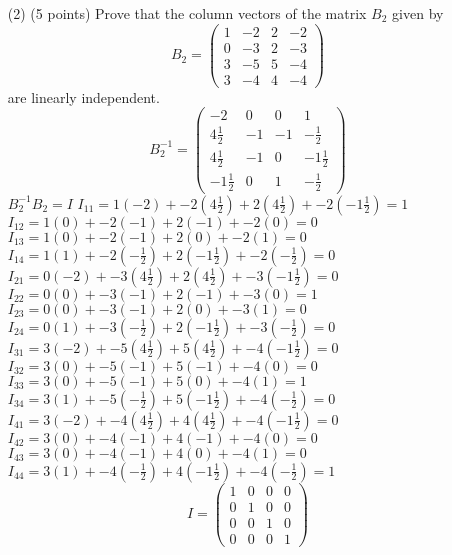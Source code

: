 \documentclass[12pt]{article}
\begin{document}
\begin{itemize}
\item[(2)](5 points)
Prove that the column vectors of the matrix $B_2$ given by 
\[
B_2 = 
\begin{pmatrix}
1 & -2 & 2 & -2\\
0 & -3 & 2 & -3 \\
3 & -5 & 5 & -4 \\
3 & -4 & 4 & -4
\end{pmatrix}
\]
are linearly  independent.
\[
B_2^{-1} = 
\begin{pmatrix}
-2 & 0 & 0 & 1\\
4\frac{1}{2} & -1 & -1 & -\frac{1}{2} \\
4\frac{1}{2} & -1 & 0 & -1\frac{1}{2} \\
-1\frac{1}{2} & 0 & 1 & -\frac{1}{2}
\end{pmatrix}
\]
$B_2^{-1}B_2=I$
\newline $I_{11}=1(-2)+-2(4\frac{1}{2})+2(4\frac{1}{2})+-2(-1\frac{1}{2})=1$
\newline $I_{12}=1(0)+-2(-1)+2(-1)+-2(0)=0$
\newline $I_{13}=1(0)+-2(-1)+2(0)+-2(1)=0$
\newline $I_{14}=1(1)+-2(-\frac{1}{2})+2(-1\frac{1}{2})+-2(-\frac{1}{2})=0$
\newline $I_{21}=0(-2)+-3(4\frac{1}{2})+2(4\frac{1}{2})+-3(-1\frac{1}{2})=0$
\newline $I_{22}=0(0)+-3(-1)+2(-1)+-3(0)=1$
\newline $I_{23}=0(0)+-3(-1)+2(0)+-3(1)=0$
\newline $I_{24}=0(1)+-3(-\frac{1}{2})+2(-1\frac{1}{2})+-3(-\frac{1}{2})=0$
\newline $I_{31}=3(-2)+-5(4\frac{1}{2})+5(4\frac{1}{2})+-4(-1\frac{1}{2})=0$
\newline $I_{32}=3(0)+-5(-1)+5(-1)+-4(0)=0$
\newline $I_{33}=3(0)+-5(-1)+5(0)+-4(1)=1$
\newline $I_{34}=3(1)+-5(-\frac{1}{2})+5(-1\frac{1}{2})+-4(-\frac{1}{2})=0$
\newline $I_{41}=3(-2)+-4(4\frac{1}{2})+4(4\frac{1}{2})+-4(-1\frac{1}{2})=0$
\newline $I_{42}=3(0)+-4(-1)+4(-1)+-4(0)=0$
\newline $I_{43}=3(0)+-4(-1)+4(0)+-4(1)=0$
\newline $I_{44}=3(1)+-4(-\frac{1}{2})+4(-1\frac{1}{2})+-4(-\frac{1}{2})=1$
\[
I = 
\begin{pmatrix}
1 & 0 & 0 & 0\\
0 & 1 & 0 & 0 \\
0 & 0 & 1 & 0 \\
0 & 0 & 0 & 1
\end{pmatrix}
\]


\end{itemize}
\end{document}
